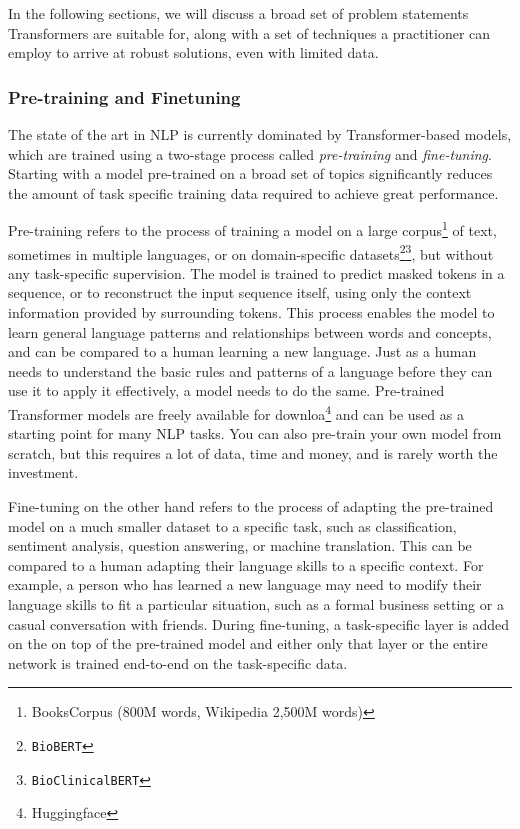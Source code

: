 In the following sections, we will discuss a broad set of problem statements Transformers are suitable for, along with a set of techniques a practitioner can employ to arrive at robust solutions, even with limited data.

\subsubsection{Pre-training and Finetuning}
The state of the art in NLP is currently dominated by Transformer-based models, which are trained using a two-stage process called \textit{pre-training} and \textit{fine-tuning}. Starting with a model pre-trained on a broad set of topics significantly reduces the amount of task specific training data required to achieve great performance.

Pre-training refers to the process of training a model on a large corpus\footnote{BooksCorpus (800M words, Wikipedia 2,500M words)}\cite{bertpaper} of text, sometimes in multiple languages, or on domain-specific datasets\footnote{\texttt{BioBERT\cite{DBLP:journals/corr/abs-1901-08746}}}\footnote{\texttt{Bio\textunderscore ClinicalBERT\cite{clinicalbert}}}, but without any task-specific supervision.
The model is trained to predict masked tokens in a sequence, or to reconstruct the input sequence itself, using only the context information provided by surrounding tokens.
This process enables the model to learn general language patterns and relationships between words and concepts, and can be compared to a human learning a new language.
Just as a human needs to understand the basic rules and patterns of a language before they can use it to apply it effectively, a model needs to do the same.
Pre-trained Transformer models are freely available for downloa\footnote{Huggingface} and can be used as a starting point for many NLP tasks.
You can also pre-train your own model from scratch, but this requires a lot of data, time and money, and is rarely worth the investment.

Fine-tuning on the other hand refers to the process of adapting the pre-trained model on a much smaller dataset to a specific task, such as classification, sentiment analysis, question answering, or machine translation.
This can be compared to a human adapting their language skills to a specific context.
For example, a person who has learned a new language may need to modify their language skills to fit a particular situation, such as a formal business setting or a casual conversation with friends.
During fine-tuning, a task-specific layer is added on the on top of the pre-trained model and either only that layer or the entire network is trained end-to-end on the task-specific data.


